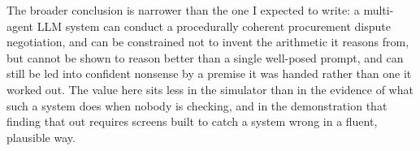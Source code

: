 The broader conclusion is narrower than the one I expected to write: a
multi-agent LLM system can conduct a procedurally coherent procurement
dispute negotiation, and can be constrained not to invent the arithmetic it
reasons from, but cannot be shown to reason better than a single
well-posed prompt, and can still be led into confident nonsense by a
premise it was handed rather than one it worked out. The value here sits
less in the simulator than in the evidence of what such a system does when
nobody is checking, and in the demonstration that finding that out
requires screens built to catch a system wrong in a fluent, plausible way.